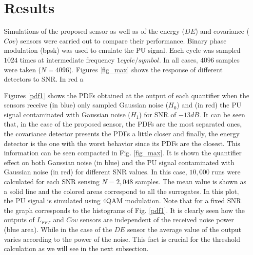 \documentclass[lettersize,journal]{IEEEtran}
\begin{document}
\section{Results}\label{secResults}

Simulations of the proposed sensor as well as of the energy ($DE$) and covariance ($Cov$) sensors were carried out to compare their performance.
Binary phase modulation (bpsk) was used to emulate the PU signal. Each cycle was sampled $1024$ times at intermediate frequency $1 cycle/symbol$. In all cases, $4096$ samples were taken ($N=4096$).
Figures \ref{fig_max} shows the response of different detectors to SNR. In red a

Figures \ref{pdf1} shows the PDFs obtained at the output of each quantifier when the sensors receive (in blue) only sampled Gaussian noise ($H_0$) and (in red) the PU signal contaminated with Gaussian noise ($H_1$) for SNR of $-13dB$. It can be seen that, in the case of the proposed sensor, the PDFs are the most separated ones, the covariance detector presents the PDFs a little closer and finally, the energy detector is the one with the worst behavior since its PDFs are the closest.
This information can be seen compacted in Fig. \ref{fig_max}. It is shown the quantifier effect on both Gaussian noise (in blue) and the PU signal contaminated with Gaussian noise (in red) for different SNR values. In this case, $10,000$ runs were calculated for each SNR sensing $N=2,048$ samples. The mean value is shown as a solid line and the colored areas correspond to all the surrogates. In this plot, the PU signal is simulated using 4QAM modulation. Note that for a fixed SNR the graph corresponds to the histograms of Fig. \ref{pdf1}. It is clearly seen how the outputs of $L_{FFT}$ and $Cov$ sensors are independent of the received noise power (blue area). While in the case of the $DE$ sensor the average value of the output varies according to the power of the noise. This fact is crucial for the threshold calculation as we will see in the next subsection.

\end{document}
